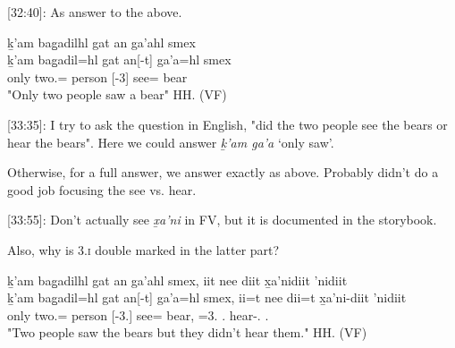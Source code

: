 [32:40]: As answer to the above.

\begin{exe}
    \ex \glll
    ḵ'am bag̱adilhl gat an ga'ahl smex \\
    ḵ'am bag̱adil=hl gat an[-t] ga'a=hl smex\\
    only two.\Hum{}=\Cn{} person \Ax{}[-3] see=\Cn{} bear\\
    \glt "Only two people saw a bear" \hfill HH.\ElicitationDate{} (VF)
\end{exe}

[33:35]: I try to ask the question in English, "did the two people see the bears or hear the bears". Here we could answer \textit{ḵ'am ga'a} `only saw'. 

Otherwise, for a full answer, we answer exactly as above. Probably didn't do a good job focusing the see vs. hear.

[33:55]: Don't actually see \textit{x̱a'ni} in FV, but it is documented in the storybook.

Also, why is \textsc{3.i} double marked in the latter part?

\begin{exe}
    \ex \glll
    ḵ'am bag̱adilhl gat an ga'ahl smex, iit nee diit x̱a'nidiit 'nidiit \\
    ḵ'am bag̱adil=hl gat an[-t] ga'a=hl smex, ii=t nee dii=t x̱a'ni-diit 'nidiit \\
    only two.\Hum{}=\Cn{} person \Ax{}[-3.\Ii{}] see=\Cn{} bear, \Ccnj{}=3.\I{} \Neg{} .\I{} hear-\Tpl{}.\I{} \Tpl{}.\Iii{}\\
    \glt "Two people saw the bears but they didn't hear them." \hfill HH.\ElicitationDate{} (VF)
\end{exe}